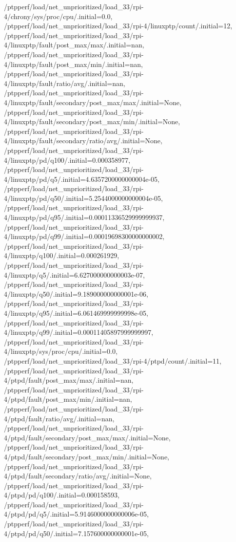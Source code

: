 {    /ptpperf/load/net_unprioritized/load_33/rpi-4/chrony/sys/proc/cpu/.initial=0.0,
    /ptpperf/load/net_unprioritized/load_33/rpi-4/linuxptp/count/.initial=12,
    /ptpperf/load/net_unprioritized/load_33/rpi-4/linuxptp/fault/post_max/max/.initial=nan,
    /ptpperf/load/net_unprioritized/load_33/rpi-4/linuxptp/fault/post_max/min/.initial=nan,
    /ptpperf/load/net_unprioritized/load_33/rpi-4/linuxptp/fault/ratio/avg/.initial=nan,
    /ptpperf/load/net_unprioritized/load_33/rpi-4/linuxptp/fault/secondary/post_max/max/.initial=None,
    /ptpperf/load/net_unprioritized/load_33/rpi-4/linuxptp/fault/secondary/post_max/min/.initial=None,
    /ptpperf/load/net_unprioritized/load_33/rpi-4/linuxptp/fault/secondary/ratio/avg/.initial=None,
    /ptpperf/load/net_unprioritized/load_33/rpi-4/linuxptp/pd/q100/.initial=0.000358977,
    /ptpperf/load/net_unprioritized/load_33/rpi-4/linuxptp/pd/q5/.initial=4.6357200000000004e-05,
    /ptpperf/load/net_unprioritized/load_33/rpi-4/linuxptp/pd/q50/.initial=5.2544000000000004e-05,
    /ptpperf/load/net_unprioritized/load_33/rpi-4/linuxptp/pd/q95/.initial=0.00011336529999999937,
    /ptpperf/load/net_unprioritized/load_33/rpi-4/linuxptp/pd/q99/.initial=0.00019698300000000002,
    /ptpperf/load/net_unprioritized/load_33/rpi-4/linuxptp/q100/.initial=0.000261929,
    /ptpperf/load/net_unprioritized/load_33/rpi-4/linuxptp/q5/.initial=6.627000000000003e-07,
    /ptpperf/load/net_unprioritized/load_33/rpi-4/linuxptp/q50/.initial=9.189000000000001e-06,
    /ptpperf/load/net_unprioritized/load_33/rpi-4/linuxptp/q95/.initial=6.061469999999998e-05,
    /ptpperf/load/net_unprioritized/load_33/rpi-4/linuxptp/q99/.initial=0.00011405897999999997,
    /ptpperf/load/net_unprioritized/load_33/rpi-4/linuxptp/sys/proc/cpu/.initial=0.0,
    /ptpperf/load/net_unprioritized/load_33/rpi-4/ptpd/count/.initial=11,
    /ptpperf/load/net_unprioritized/load_33/rpi-4/ptpd/fault/post_max/max/.initial=nan,
    /ptpperf/load/net_unprioritized/load_33/rpi-4/ptpd/fault/post_max/min/.initial=nan,
    /ptpperf/load/net_unprioritized/load_33/rpi-4/ptpd/fault/ratio/avg/.initial=nan,
    /ptpperf/load/net_unprioritized/load_33/rpi-4/ptpd/fault/secondary/post_max/max/.initial=None,
    /ptpperf/load/net_unprioritized/load_33/rpi-4/ptpd/fault/secondary/post_max/min/.initial=None,
    /ptpperf/load/net_unprioritized/load_33/rpi-4/ptpd/fault/secondary/ratio/avg/.initial=None,
    /ptpperf/load/net_unprioritized/load_33/rpi-4/ptpd/pd/q100/.initial=0.000158593,
    /ptpperf/load/net_unprioritized/load_33/rpi-4/ptpd/pd/q5/.initial=5.9146000000000006e-05,
    /ptpperf/load/net_unprioritized/load_33/rpi-4/ptpd/pd/q50/.initial=7.157600000000001e-05,
}
